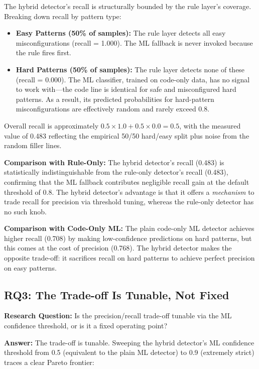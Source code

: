 The hybrid detector's recall is structurally bounded by the rule layer's coverage. Breaking down recall by pattern type:

\begin{itemize}
  \item \textbf{Easy Patterns (50\% of samples):} The rule layer detects all easy misconfigurations (recall = 1.000). The ML fallback is never invoked because the rule fires first.
  
  \item \textbf{Hard Patterns (50\% of samples):} The rule layer detects none of these (recall = 0.000). The ML classifier, trained on code-only data, has no signal to work with—the code line is identical for safe and misconfigured hard patterns. As a result, its predicted probabilities for hard-pattern misconfigurations are effectively random and rarely exceed 0.8.
\end{itemize}

Overall recall is approximately $0.5 \times 1.0 + 0.5 \times 0.0 = 0.5$, with the measured value of 0.483 reflecting the empirical 50/50 hard/easy split plus noise from the random filler lines.

\textbf{Comparison with Rule-Only:} The hybrid detector's recall (0.483) is statistically indistinguishable from the rule-only detector's recall (0.483), confirming that the ML fallback contributes negligible recall gain at the default threshold of 0.8. The hybrid detector's advantage is that it offers a \emph{mechanism} to trade recall for precision via threshold tuning, whereas the rule-only detector has no such knob.

\textbf{Comparison with Code-Only ML:} The plain code-only ML detector achieves higher recall (0.708) by making low-confidence predictions on hard patterns, but this comes at the cost of precision (0.768). The hybrid detector makes the opposite trade-off: it sacrifices recall on hard patterns to achieve perfect precision on easy patterns.

\subsection{RQ3: The Trade-off Is Tunable, Not Fixed}
\label{sec:evalThree}

\textbf{Research Question:} Is the precision/recall trade-off tunable via the ML confidence threshold, or is it a fixed operating point?

\textbf{Answer:} The trade-off is tunable. Sweeping the hybrid detector's ML confidence threshold from 0.5 (equivalent to the plain ML detector) to 0.9 (extremely strict) traces a clear Pareto frontier:

